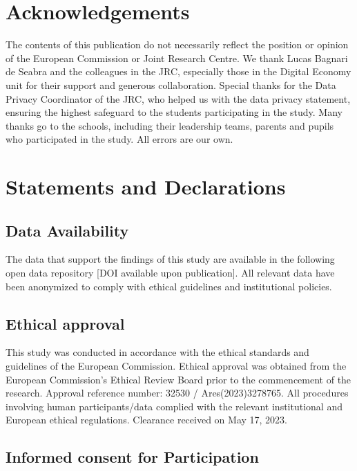 \documentclass[
  11pt,
]{article}
\begin{document}
\section{Acknowledgements}\label{acknowledgements}

The contents of this publication do not necessarily reflect the position or opinion of the European Commission or Joint Research Centre. We thank Lucas Bagnari de Seabra and the colleagues in the JRC, especially those in the Digital Economy unit for their support and generous collaboration. Special thanks for the Data Privacy Coordinator of the JRC, who helped us with the data privacy statement, ensuring the highest safeguard to the students participating in the study. Many thanks go to the schools, including their leadership teams, parents and pupils who participated in the study. All errors are our own.

\section{Statements and Declarations}\label{statements-and-declarations}

\subsection{Data Availability}\label{data-availability}

The data that support the findings of this study are available in the following open data repository {[}DOI available upon publication{]}. All relevant data have been anonymized to comply with ethical guidelines and institutional policies.

\subsection{Ethical approval}\label{ethical-approval}

This study was conducted in accordance with the ethical standards and guidelines of the European Commission. Ethical approval was obtained from the European Commission's Ethical Review Board prior to the commencement of the research. Approval reference number: 32530 / Ares(2023)3278765. All procedures involving human participants/data complied with the relevant institutional and European ethical regulations. Clearance received on May 17, 2023.

\subsection{Informed consent for Participation}\label{informed-consent-for-participation}
\end{document}

